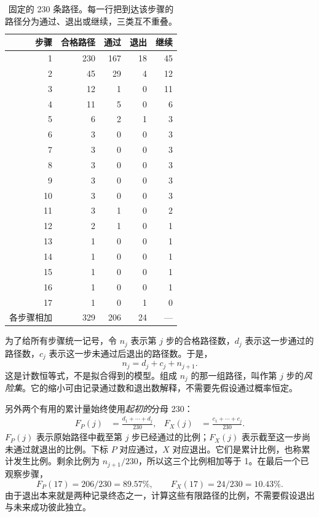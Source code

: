 \begin{table}[htbp]
\centering
\caption{固定的 230 条路径。每一行把到达该步骤的路径分为通过、退出或继续，三类互不重叠。}
\label{tab:process-counts}
\small
\begin{tabular}{rrrrr}
\toprule
步骤 & 合格路径 & 通过 & 退出 & 继续 \\
\midrule
1 & 230 & 167 & 18 & 45 \\
2 & 45 & 29 & 4 & 12 \\
3 & 12 & 1 & 0 & 11 \\
4 & 11 & 5 & 0 & 6 \\
5 & 6 & 2 & 1 & 3 \\
6 & 3 & 0 & 0 & 3 \\
7 & 3 & 0 & 0 & 3 \\
8 & 3 & 0 & 0 & 3 \\
9 & 3 & 0 & 0 & 3 \\
10 & 3 & 0 & 0 & 3 \\
11 & 3 & 1 & 0 & 2 \\
12 & 2 & 1 & 0 & 1 \\
13 & 1 & 0 & 0 & 1 \\
14 & 1 & 0 & 0 & 1 \\
15 & 1 & 0 & 0 & 1 \\
16 & 1 & 0 & 0 & 1 \\
17 & 1 & 0 & 1 & 0 \\
\midrule
各步骤相加 & 329 & 206 & 24 & --- \\
\bottomrule
\end{tabular}
\end{table}

为了给所有步骤统一记号，令 $n_j$ 表示第 $j$ 步的合格路径数，$d_j$ 表示这一步通过的路径数，$c_j$ 表示这一步未通过后退出的路径数。于是，
\begin{equation}
 n_j=d_j+c_j+n_{j+1}.
 \label{eq:cohort-conservation}
\end{equation}
这是计数恒等式，不是拟合得到的模型。组成 $n_j$ 的那一组路径，叫作第 $j$ 步的\emph{风险集}。它的缩小可由记录通过数和退出数解释，不需要先假设通过概率恒定。

另外两个有用的累计量始终使用\emph{起初的}分母 230：
\begin{align}
 F_P(j)&=\frac{d_1+\cdots+d_j}{230},
 &F_X(j)&=\frac{c_1+\cdots+c_j}{230}.
 \label{eq:finite-incidences}
\end{align}
$F_P(j)$ 表示原始路径中截至第 $j$ 步已经通过的比例；$F_X(j)$ 表示截至这一步尚未通过就退出的比例。下标 $P$ 对应通过，$X$ 对应退出。它们是累计比例，也称累计发生比例。剩余比例为 $n_{j+1}/230$，所以这三个比例相加等于 1。在最后一个已观察步骤，
\[
 F_P(17)=206/230=89.57\%,\qquad
 F_X(17)=24/230=10.43\%.
\]
由于退出本来就是两种记录终态之一，计算这些有限路径的比例，不需要假设退出与未来成功彼此独立。


